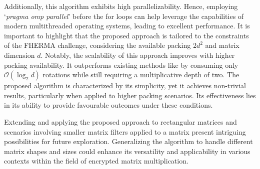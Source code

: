 \documentclass[journal=tosc,final]{iacrtrans}
\begin{document}
Additionally, this algorithm exhibits high parallelizability. Hence, employing `\textit{pragma omp parallel}' before the for loops can help leverage the capabilities of modern multithreaded operating systems, leading to excellent performance. It is important to highlight that the proposed approach is tailored to the constraints of the FHERMA challenge, considering the available packing $2d^2$ and matrix dimension $d$. Notably, the scalability of this approach improves with higher packing availability. It outperforms existing methods like \cite{mult2_d2, mult1_d3} by consuming only $\mathcal{O}(\log_2{d})$ rotations while still requiring a multiplicative depth of two. The proposed algorithm is characterized by its simplicity, yet it achieves non-trivial results, particularly when applied to higher packing scenarios. Its effectiveness lies in its ability to provide favourable outcomes under these conditions.

Extending and applying the proposed approach to rectangular matrices and scenarios involving smaller matrix filters applied to a matrix present intriguing possibilities for future exploration. Generalizing the algorithm to handle different matrix shapes and sizes could enhance its versatility and applicability in various contexts within the field of encrypted matrix multiplication.
\end{document}
